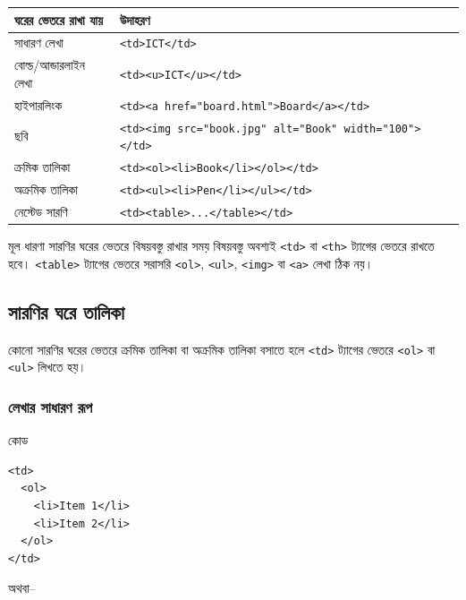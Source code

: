 \begin{center}
\footnotesize
\begin{tabular}{|p{}|p{}|}
\hline
\textbf{ঘরের ভেতরে রাখা যায়} & \textbf{উদাহরণ} \\
\hline
সাধারণ লেখা & \texttt{<td>ICT</td>} \\
\hline
বোল্ড/আন্ডারলাইন লেখা & \texttt{<td><u>ICT</u></td>} \\
\hline
হাইপারলিংক & \texttt{<td><a href="board.html">Board</a></td>} \\
\hline
ছবি & \texttt{<td><img src="book.jpg" alt="Book" width="100"></td>} \\
\hline
ক্রমিক তালিকা & \texttt{<td><ol><li>Book</li></ol></td>} \\
\hline
অক্রমিক তালিকা & \texttt{<td><ul><li>Pen</li></ul></td>} \\
\hline
নেস্টেড সারণি & \texttt{<td><table>...</table></td>} \\
\hline
\end{tabular}
\end{center}

\begin{keypointbox}{মূল ধারণা}
সারণির ঘরের ভেতরে বিষয়বস্তু রাখার সময় বিষয়বস্তু অবশ্যই \texttt{<td>} বা \texttt{<th>} ট্যাগের ভেতরে রাখতে হবে। \texttt{<table>} ট্যাগের ভেতরে সরাসরি \texttt{<ol>}, \texttt{<ul>}, \texttt{<img>} বা \texttt{<a>} লেখা ঠিক নয়।
\end{keypointbox}

\subsection{সারণির ঘরে তালিকা}

কোনো সারণির ঘরের ভেতরে ক্রমিক তালিকা বা অক্রমিক তালিকা বসাতে হলে \texttt{<td>} ট্যাগের ভেতরে \texttt{<ol>} বা \texttt{<ul>} লিখতে হয়।

\subsubsection{লেখার সাধারণ রূপ}

\begin{examplebox}{কোড}
\begin{verbatim}
<td>
  <ol>
    <li>Item 1</li>
    <li>Item 2</li>
  </ol>
</td>
\end{verbatim}
\end{examplebox}

অথবা--


